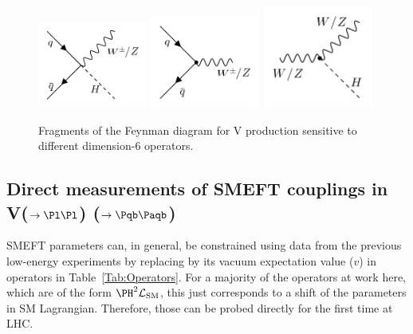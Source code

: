 \documentclass[a4paper,11pt]{article}
\newcommand{\Pb}{{{\Pqb}}\xspace}
\newcommand{\PAb}{{{{\Paqb}}}\xspace}
\renewcommand{\PV}{{{{V}}}\xspace}
\newcommand{\VH}{{{\PV}{\PH}}\xspace}
\begin{document}
\begin{figure}[hbtp]
\begin{center}
\includegraphics[width=0.321\textwidth]{Figures/Feynman_diagrams/ffVh.png}
\includegraphics[width=0.321\textwidth]{Figures/Feynman_diagrams/Vff.png}
\includegraphics[width=0.321\textwidth]{Figures/Feynman_diagrams/hVV.png}
\end{center}
\caption{
Fragments of the Feynman diagram for \VH production sensitive to different dimension-6 operators.
}
\label{fig:Feynman_digarams}
\end{figure}

\subsection{Direct measurements of SMEFT couplings in \PV($\to \Pl \Pl $) \PH ($\to \Pb \PAb$)}

SMEFT parameters can, in general, be constrained using data from the previous low-energy experiments by replacing \PH by its vacuum expectation value ($v$) in operators in Table~\ref{Tab:Operators}. For a majority of the operators at work here, which are of the form ${\PH}^2\mathcal{L}_{\text{SM}}$,
this just corresponds to a shift of the parameters in SM Lagrangian. 
Therefore, those can be probed directly for the first time at LHC.
\end{document}
